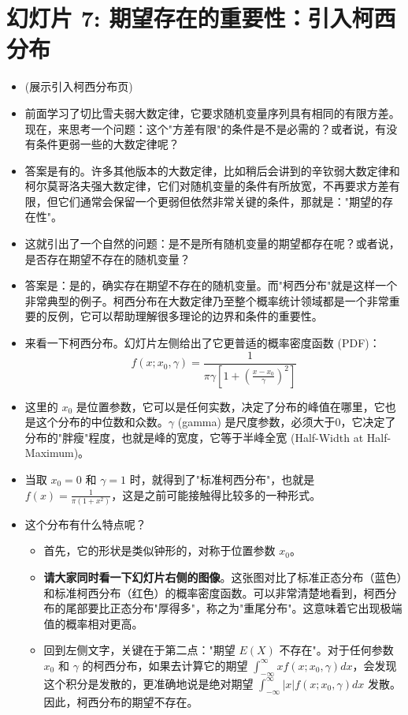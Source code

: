 \documentclass[UTF8]{article} %
\begin{document}
\section*{幻灯片 7: 期望存在的重要性：引入柯西分布}
\begin{itemize}
    \itemsep1em
    \item (展示引入柯西分布页)
    \item 前面学习了切比雪夫弱大数定律，它要求随机变量序列具有相同的有限方差。现在，来思考一个问题：这个"方差有限"的条件是不是必需的？或者说，有没有条件更弱一些的大数定律呢？
    \item 答案是有的。许多其他版本的大数定律，比如稍后会讲到的辛钦弱大数定律和柯尔莫哥洛夫强大数定律，它们对随机变量的条件有所放宽，不再要求方差有限，但它们通常会保留一个更弱但依然非常关键的条件，那就是："期望的存在性"。
    \item 这就引出了一个自然的问题：是不是所有随机变量的期望都存在呢？或者说，是否存在期望不存在的随机变量？
    \item 答案是：是的，确实存在期望不存在的随机变量。而"柯西分布"就是这样一个非常典型的例子。柯西分布在大数定律乃至整个概率统计领域都是一个非常重要的反例，它可以帮助理解很多理论的边界和条件的重要性。
    \item 来看一下柯西分布。幻灯片左侧给出了它更普适的概率密度函数 (PDF)：
    \[ f(x; x_0, \gamma) = \frac{1}{\pi\gamma \left[1 + \left(\frac{x-x_0}{\gamma}\right)^2\right]} \]
    \item 这里的 $x_0$ 是位置参数，它可以是任何实数，决定了分布的峰值在哪里，它也是这个分布的中位数和众数。$\gamma$ (gamma) 是尺度参数，必须大于0，它决定了分布的"胖瘦"程度，也就是峰的宽度，它等于半峰全宽 (Half-Width at Half-Maximum)。
    \item 当取 $x_0=0$ 和 $\gamma=1$ 时，就得到了"标准柯西分布"，也就是 $f(x) = \frac{1}{\pi (1+x^2)}$，这是之前可能接触得比较多的一种形式。
    \item 这个分布有什么特点呢？
    \begin{itemize}[label=\textbullet, itemsep=0.3em]
        \item 首先，它的形状是类似钟形的，对称于位置参数 $x_0$。
        \item \textbf{请大家同时看一下幻灯片右侧的图像}。这张图对比了标准正态分布（蓝色）和标准柯西分布（红色）的概率密度函数。可以非常清楚地看到，柯西分布的尾部要比正态分布"厚得多"，称之为"重尾分布"。这意味着它出现极端值的概率相对更高。
        \item 回到左侧文字，关键在于第二点："期望 $E(X)$ 不存在"。对于任何参数 $x_0$ 和 $\gamma$ 的柯西分布，如果去计算它的期望 $\int_{-\infty}^{\infty} x f(x; x_0, \gamma) dx$，会发现这个积分是发散的，更准确地说是绝对期望 $\int_{-\infty}^{\infty} |x| f(x; x_0, \gamma) dx$ 发散。因此，柯西分布的期望不存在。

\end{itemize}
\end{itemize}
\end{document}
